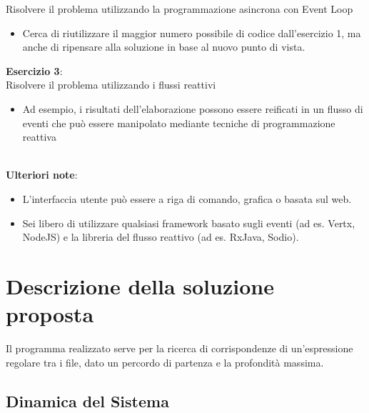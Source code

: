 \documentclass[a4paper]{article}
\begin{document}
Risolvere il problema utilizzando la programmazione asincrona con Event Loop
        \begin{itemize}
            \item Cerca di riutilizzare il maggior numero possibile di codice dall'esercizio 1, ma anche di ripensare alla soluzione in base al nuovo punto di vista.
        \end{itemize}
\textbf{Esercizio 3}:\\
Risolvere il problema utilizzando i flussi reattivi
        \begin{itemize}
            \item Ad esempio, i risultati dell'elaborazione possono essere reificati in un flusso di eventi che può essere manipolato mediante tecniche di programmazione reattiva
        \end{itemize}
\\
\textbf{Ulteriori note}:
\begin{itemize}
    \item L'interfaccia utente può essere a riga di comando, grafica o basata sul web. 
    \item Sei libero di utilizzare qualsiasi framework basato sugli eventi (ad es. Vertx, NodeJS) e la libreria del flusso reattivo (ad es. RxJava, Sodio).
\end{itemize}

\section{Descrizione della soluzione proposta}\label{descrizione-della-soluzione-proposta}
Il programma realizzato serve per la ricerca di corrispondenze di un'espressione regolare tra i file, dato un percordo di partenza e la profondità massima. 
\subsection{Dinamica del Sistema}
\end{document}
